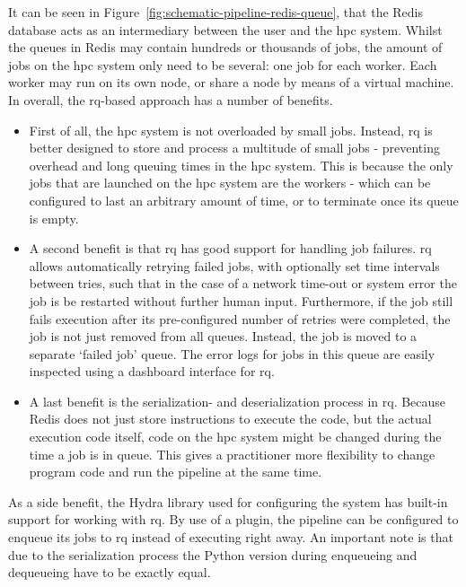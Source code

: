 \documentclass[../main.tex]{subfiles}
\begin{document}
It can be seen in Figure~\ref{fig:schematic-pipeline-redis-queue}, that the Redis database acts as an intermediary between the user and the \gls{hpc} system. Whilst the queues in Redis may contain hundreds or thousands of jobs, the amount of jobs on the \gls{hpc} system only need to be several: one job for each worker. Each worker may run on its own node, or share a node by means of a virtual machine. In overall, the \gls{rq}-based approach has a number of benefits.

\begin{itemize}
    \item First of all, the \gls{hpc} system is not overloaded by small jobs. Instead, \gls{rq} is better designed to store and process a multitude of small jobs - preventing overhead and long queuing times in the \gls{hpc} system. This is because the only jobs that are launched on the \gls{hpc} system are the workers - which can be configured to last an arbitrary amount of time, or to terminate once its queue is empty.
    \item A second benefit is that \gls{rq} has good support for handling job failures. \gls{rq} allows automatically retrying failed jobs, with optionally set time intervals between tries, such that in the case of a network time-out or system error the job is be restarted without further human input. Furthermore, if the job still fails execution after its pre-configured number of retries were completed, the job is not just removed from all queues. Instead, the job is moved to a separate `failed job' queue. The error logs for jobs in this queue are easily inspected using a dashboard interface for \gls{rq}.
    \item A last benefit is the serialization- and deserialization process in \gls{rq}. Because Redis does not just store instructions to execute the code, but the actual execution code itself, code on the \gls{hpc} system might be changed during the time a job is in queue. This gives a practitioner more flexibility to change program code and run the pipeline at the same time.
\end{itemize}

As a side benefit, the Hydra library used for configuring the system has built-in support for working with \gls{rq}. By use of a plugin, the pipeline can be configured to enqueue its jobs to \gls{rq} instead of executing right away. An important note is that due to the serialization process the Python version during enqueueing and dequeueing have to be exactly equal.
\end{document}
